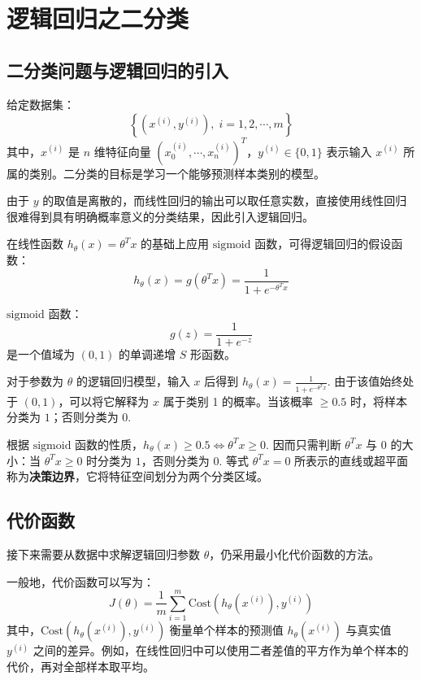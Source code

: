 \section{逻辑回归之二分类}
\label{sec:chapter4}

\subsection{二分类问题与逻辑回归的引入}

给定数据集：
\[
\left\{\left(x^{(i)},y^{(i)}\right),\;i=1,2,\cdots,m\right\}
\]
其中，$x^{(i)}$ 是 $n$ 维特征向量 $(x_0^{(i)},\cdots,x_n^{(i)})^T$，$y^{(i)}\in\{0,1\}$ 表示输入 $x^{(i)}$ 所属的类别。二分类的目标是学习一个能够预测样本类别的模型。

由于 $y$ 的取值是离散的，而线性回归的输出可以取任意实数，直接使用线性回归很难得到具有明确概率意义的分类结果，因此引入逻辑回归。

在线性函数 $h_\theta(x)=\theta^Tx$ 的基础上应用 $\text{sigmoid}$ 函数，可得逻辑回归的假设函数：
\[
h_\theta(x)=g\left(\theta^Tx\right)=\frac{1}{1+e^{-\theta^T x}}
\]

\begin{remark}
$\text{sigmoid}$ 函数：
\[
g(z)=\frac{1}{1+e^{-z}}
\]
是一个值域为 $(0,1)$ 的单调递增 $S$ 形函数。
\end{remark}

对于参数为 $\theta$ 的逻辑回归模型，输入 $x$ 后得到 $h_\theta(x)=\frac{1}{1+e^{-\theta^Tx}}$. 由于该值始终处于 $(0,1)$，可以将它解释为 $x$ 属于类别 1 的概率。当该概率 $\geqslant 0.5$ 时，将样本分类为 $1$；否则分类为 $0$. 

根据 $\text{sigmoid}$ 函数的性质，$h_\theta(x)\geqslant 0.5\iff \theta^Tx\geqslant0$. 因而只需判断 $\theta^Tx$ 与 $0$ 的大小：当 $\theta^Tx\geqslant0$ 时分类为 $1$，否则分类为 $0$. 等式 $\theta^Tx=0$ 所表示的直线或超平面称为\textbf{决策边界}，它将特征空间划分为两个分类区域。


\subsection{代价函数}

接下来需要从数据中求解逻辑回归参数 $\theta$，仍采用最小化代价函数的方法。

一般地，代价函数可以写为：
\[
J(\theta)=\frac{1}{m}\sum_{i=1}^m\text{Cost}\left(h_\theta(x^{(i)}),y^{(i)}\right)
\]
其中，$\text{Cost}\left(h_\theta(x^{(i)}),y^{(i)}\right)$ 衡量单个样本的预测值 $h_\theta(x^{(i)})$ 与真实值 $y^{(i)}$ 之间的差异。例如，在线性回归中可以使用二者差值的平方作为单个样本的代价，再对全部样本取平均。


